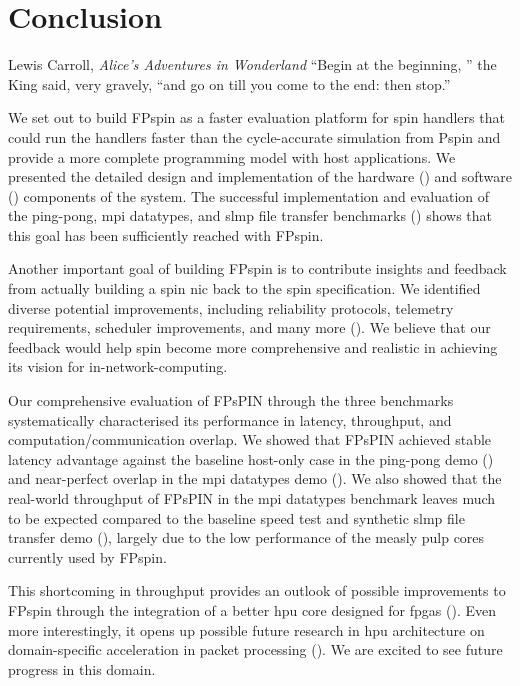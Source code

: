 \chapter{Conclusion}
\begin{chapquote}{Lewis Carroll, \textit{Alice's Adventures in Wonderland}}
``Begin at the beginning, '' the King said, very gravely, ``and go on till you come to the end: then stop.''
\end{chapquote}

We set out to build FP\acs{spin} as a faster evaluation platform for \ac{spin} handlers that could run the handlers faster than the cycle-accurate simulation from P\acs{spin} and provide a more complete programming model with host applications.  We presented the detailed design and implementation of the hardware () and software () components of the system.  The successful implementation and evaluation of the ping-pong, \ac{mpi} datatypes, and \ac{slmp} file transfer benchmarks () shows that this goal has been sufficiently reached with FP\acs{spin}.

Another important goal of building FP\acs{spin} is to contribute insights and feedback from actually building a \ac{spin} \ac{nic} back to the \ac{spin} specification.  We identified diverse potential improvements, including reliability protocols, telemetry requirements, scheduler improvements, and many more ().  We believe that our feedback would help \ac{spin} become more comprehensive and realistic in achieving its vision for in-network-computing.

Our comprehensive evaluation of FPsPIN through the three benchmarks systematically characterised its performance in latency, throughput, and computation/communication overlap.  We showed that FPsPIN achieved stable latency advantage against the baseline host-only case in the ping-pong demo () and near-perfect overlap in the \ac{mpi} datatypes demo ().  We also showed that the real-world throughput of FPsPIN in the \ac{mpi} datatypes benchmark leaves much to be expected compared to the baseline speed test and synthetic \ac{slmp} file transfer demo (), largely due to the low performance of the measly \ac{pulp} cores currently used by FP\acs{spin}.

This shortcoming in throughput provides an outlook of possible improvements to FP\acs{spin} through the integration of a better \ac{hpu} core designed for \ac{fpga}s ().  Even more interestingly, it opens up possible future research in \ac{hpu} architecture on domain-specific acceleration in packet processing ().  We are excited to see future progress in this domain.
